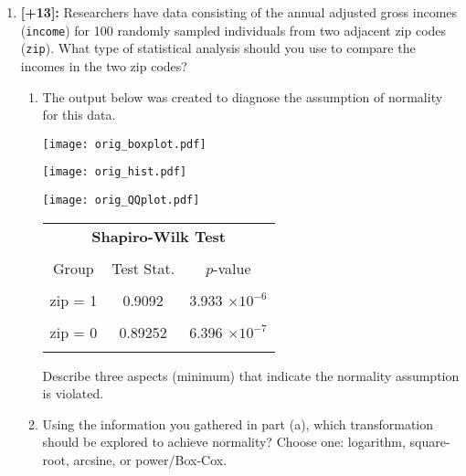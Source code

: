 \documentclass[11pt]{article}
\begin{document}
\begin{enumerate}
\newpage
	
\item \textbf{[+13]:} Researchers have data consisting of the annual adjusted gross incomes (\texttt{income}) for 100 randomly sampled   individuals from two adjacent zip codes (\texttt{zip}). What type of statistical analysis should you use to compare the incomes in the two zip codes?
	\begin{enumerate}
	\item The output below was created to diagnose  the assumption of normality for this data.
	\begin{minipage}{0.45\textwidth}
		\texttt{[image: orig\_boxplot.pdf]}
	\end{minipage}
	\begin{minipage}{0.45\textwidth}
		\texttt{[image: orig\_hist.pdf]}
	\end{minipage}
	 
	\begin{minipage}{0.45\textwidth}
		\texttt{[image: orig\_QQplot.pdf]}
	\end{minipage}
	\begin{minipage}{0.45\textwidth}
		\begin{center}
		\footnotesize{
		\begin{tabular}{c|cc}
			\multicolumn{3}{c}{\textbf{Shapiro-Wilk Test}} \\ 
			\multicolumn{3}{c}{} \\
			Group & Test Stat. & $p$-value \\
			\hline \\
			zip = 1 & 0.9092 & 3.933 $\times 10^{-6}$\\ \\
			zip = 0 & 0.89252 & 6.396 $\times 10^{-7}$\\ \\
		\end{tabular}}
		\end{center}
	\end{minipage}
	\vspace{12pt}
	
	Describe three aspects (minimum) that indicate the normality assumption is violated.
	
	\newpage
	\item Using the information you gathered in part (a), which transformation should be explored to achieve normality? Choose one: logarithm, square-root, arcsine, or power/Box-Cox.
	\vspace{1in}
	

\end{enumerate}
\end{enumerate}
\end{document}
